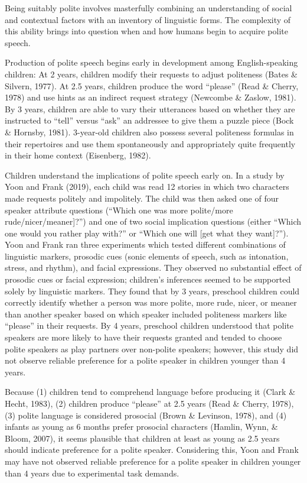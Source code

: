 \documentclass[
  english,
  man,floatsintext]{apa6}
\begin{document}
Being suitably polite involves masterfully combining an understanding of social and contextual factors with an inventory of linguistic forms. The complexity of this ability brings into question when and how humans begin to acquire polite speech.

Production of polite speech begins early in development among English-speaking children: At 2 years, children modify their requests to adjust politeness (Bates \& Silvern, 1977). At 2.5 years, children produce the word ``please'' (Read \& Cherry, 1978) and use hints as an indirect request strategy (Newcombe \& Zaslow, 1981). By 3 years, children are able to vary their utterances based on whether they are instructed to ``tell'' versus ``ask'' an addressee to give them a puzzle piece (Bock \& Hornsby, 1981). 3-year-old children also possess several politeness formulas in their repertoires and use them spontaneously and appropriately quite frequently in their home context (Eisenberg, 1982).

Children understand the implications of polite speech early on. In a study by Yoon and Frank (2019), each child was read 12 stories in which two characters made requests politely and impolitely. The child was then asked one of four speaker attribute questions (``Which one was more polite/more rude/nicer/meaner{]}?'') and one of two social implication questions (either ``Which one would you rather play with?'' or ``Which one will {[}get what they want{]}?''). Yoon and Frank ran three experiments which tested different combinations of linguistic markers, prosodic cues (sonic elements of speech, such as intonation, stress, and rhythm), and facial expressions. They observed no substantial effect of prosodic cues or facial expression; children's inferences seemed to be supported solely by linguistic markers. They found that by 3 years, preschool children could correctly identify whether a person was more polite, more rude, nicer, or meaner than another speaker based on which speaker included politeness markers like ``please'' in their requests. By 4 years, preschool children understood that polite speakers are more likely to have their requests granted and tended to choose polite speakers as play partners over non-polite speakers; however, this study did not observe reliable preference for a polite speaker in children younger than 4 years.

Because (1) children tend to comprehend language before producing it (Clark \& Hecht, 1983), (2) children produce ``please'' at 2.5 years (Read \& Cherry, 1978), (3) polite language is considered prosocial (Brown \& Levinson, 1978), and (4) infants as young as 6 months prefer prosocial characters (Hamlin, Wynn, \& Bloom, 2007), it seems plausible that children at least as young as 2.5 years should indicate preference for a polite speaker. Considering this, Yoon and Frank may have not observed reliable preference for a polite speaker in children younger than 4 years due to experimental task demands.
\end{document}
